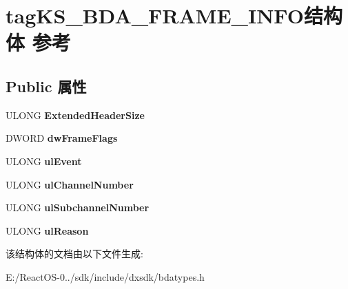 \hypertarget{structtag_k_s___b_d_a___f_r_a_m_e___i_n_f_o}{}\section{tag\+K\+S\+\_\+\+B\+D\+A\+\_\+\+F\+R\+A\+M\+E\+\_\+\+I\+N\+F\+O结构体 参考}
\label{structtag_k_s___b_d_a___f_r_a_m_e___i_n_f_o}
\subsection*{Public 属性}
\begin{DoxyCompactItemize}
\item 
\mbox{\label{structtag_k_s___b_d_a___f_r_a_m_e___i_n_f_o_a701a4d846db0a4ca245f10acea9b2c94}} 
U\+L\+O\+NG {\bfseries Extended\+Header\+Size}
\item 
\mbox{\label{structtag_k_s___b_d_a___f_r_a_m_e___i_n_f_o_a294a37edc3efb20e3b6d31f78e79d3a2}} 
D\+W\+O\+RD {\bfseries dw\+Frame\+Flags}
\item 
\mbox{\label{structtag_k_s___b_d_a___f_r_a_m_e___i_n_f_o_abd764ea3394d13a84fef41f978516992}} 
U\+L\+O\+NG {\bfseries ul\+Event}
\item 
\mbox{\label{structtag_k_s___b_d_a___f_r_a_m_e___i_n_f_o_ad004f890818dd0753a50a78d4cef2e09}} 
U\+L\+O\+NG {\bfseries ul\+Channel\+Number}
\item 
\mbox{\label{structtag_k_s___b_d_a___f_r_a_m_e___i_n_f_o_a29ab46fa4e4bdd4dc74deb4ecf9cbdb7}} 
U\+L\+O\+NG {\bfseries ul\+Subchannel\+Number}
\item 
\mbox{\label{structtag_k_s___b_d_a___f_r_a_m_e___i_n_f_o_a542a2348fe47b56b7fabc8131a43809f}} 
U\+L\+O\+NG {\bfseries ul\+Reason}
\end{DoxyCompactItemize}


该结构体的文档由以下文件生成\+:\begin{DoxyCompactItemize}
\item 
E\+:/\+React\+O\+S-\/0../sdk/include/dxsdk/bdatypes.\+h\end{DoxyCompactItemize}
